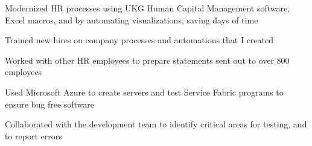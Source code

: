 \documentclass[]{deedy-resume-openfont}
\begin{document}
\begin{minipage}[t]{0.95\textwidth}
\begin{tightemize}
\item Modernized HR processes using UKG Human Capital Management software, Excel macros, and by automating visualizations, saving days of time
\item Trained new hires on company processes and automations that I created
\item Worked with other HR employees to prepare statements sent out to over 800 employees
\end{tightemize}

\begin{tightemize}
\item Used Microsoft Azure to create servers and test Service Fabric programs to ensure bug free software
\item Collaborated with the development team to identify critical areas for testing, and to report errors
\end{tightemize}






\end{minipage}
\end{document}
